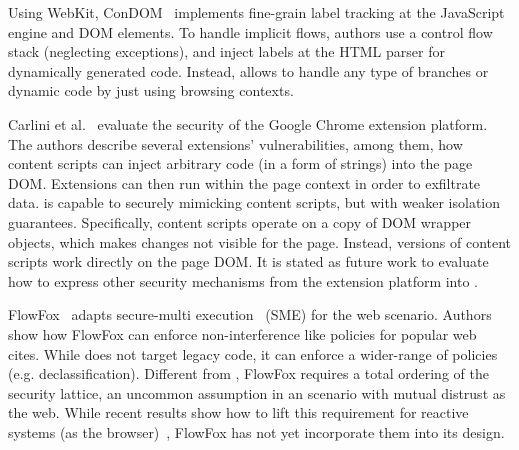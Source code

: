 Using WebKit, ConDOM~\cite{ConDOM} implements fine-grain label tracking at the
JavaScript engine and DOM elements. To handle implicit flows, authors use a
control flow stack (neglecting exceptions), and inject labels at the HTML parser
for dynamically generated code. Instead, \sys{} allows to handle any type of
branches or dynamic code by just using browsing contexts.

Carlini et al.~\cite{Carlini:2012} evaluate the security of the Google Chrome
extension platform. The authors describe several extensions' vulnerabilities, among them,
how content scripts can inject arbitrary code (in a form of strings) into the
page DOM. Extensions can then run within the page context in order
to exfiltrate data. \sys{} is capable to securely mimicking content scripts, but
with weaker isolation guarantees.  Specifically, content scripts operate on a
copy of DOM wrapper objects, which makes changes not visible for the
page. Instead, \sys{} versions of content scripts work directly on the page DOM.
It is stated as future work to evaluate how to express other 
security mechanisms from the extension platform into \sys{}. 


FlowFox~\cite{DeGroef:2012} adapts secure-multi execution~\cite{Devriese:2010}
(SME) for the web scenario. Authors show how FlowFox can enforce
non-interference like policies for popular web cites. While \sys{} does not
target legacy code, it can enforce a wider-range of policies
(e.g. declassification). Different from \sys{}, FlowFox requires a total
ordering of the security lattice, an uncommon assumption in an scenario with
mutual distrust as the web. While recent results show how to lift this
requirement for reactive systems (as the browser)~\cite{ZanariniJR13}, FlowFox
has not yet incorporate them into its design.
 
 

